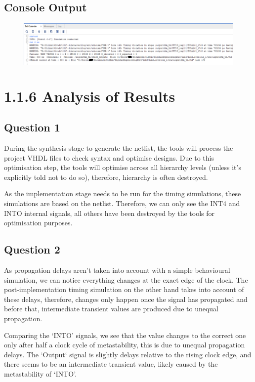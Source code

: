 \documentclass[11pt]{report}
\begin{document}
\subsection*{Console Output}
\begin{figure}[H]
    \includegraphics[width=\columnwidth]{Waveforms/50ns_timing_sim-console.png}
\end{figure}


\section*{1.1.6 Analysis of Results}
\subsection*{Question 1}
During the synthesis stage to generate the netlist, the tools will process the project VHDL files to check syntax and optimise designs. Due to this optimisation step, the tools will optimise across all hierarchy levels (unless it's explicitly told not to do so), therefore, hierarchy is often destroyed. 

As the implementation stage needs to be run for the timing simulations, these simulations are based on the netlist. Therefore, we can only see the INT4 and INTO internal signals, all others have been destroyed by the tools for optimisation purposes.

\subsection*{Question 2}
As propagation delays aren't taken into account with a simple behavioural simulation, we can notice everything changes at the exact edge of the clock. The post-implementation timing simulation on the other hand takes into account of these delays, therefore, changes only happen once the signal has propagated and before that, intermediate transient values are produced due to unequal propagation.

Comparing the `INTO' signals, we see that the value changes to the correct one only after half a clock cycle of metastability, this is due to unequal propagation delays. The `Output` signal is slightly delays relative to the rising clock edge, and there seems to be an intermediate transient value, likely caused by the metastability of `INTO'.
\end{document}
